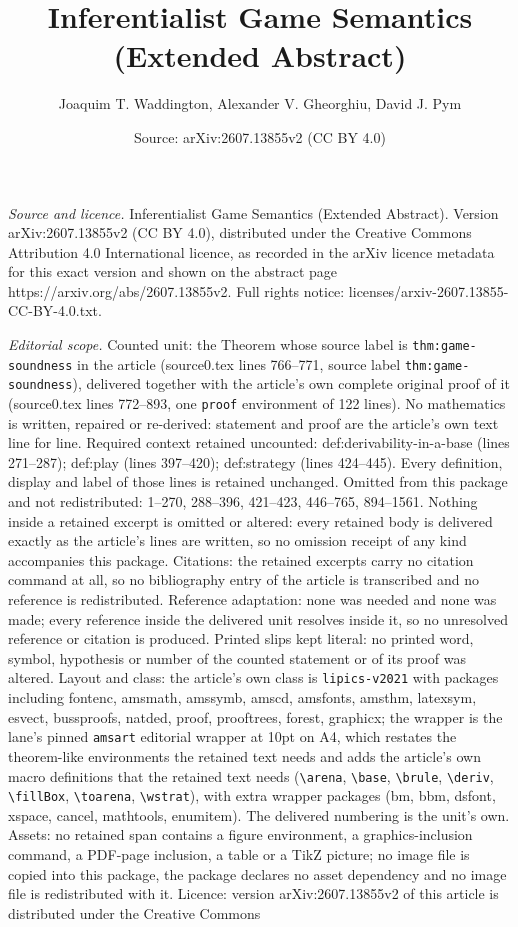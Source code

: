 \documentclass[10pt,a4paper]{amsart}
\title[Inferentialist Game Semantics (Extended Abstract)]{Inferentialist Game Semantics (Extended Abstract)}
\author{Joaquim T. Waddington, Alexander V. Gheorghiu, David J. Pym}
\date{Source: arXiv:2607.13855v2 (CC BY 4.0)}
\begin{document}
\maketitle

\noindent\emph{Source and licence.} Inferentialist Game Semantics (Extended Abstract). Version arXiv:2607.13855v2 (CC BY 4.0), distributed under the Creative Commons Attribution 4.0 International licence, as recorded in the arXiv licence metadata for this exact version and shown on the abstract page https://arxiv.org/abs/2607.13855v2. Full rights notice: licenses/arxiv-2607.13855-CC-BY-4.0.txt.\par\smallskip

\noindent\textit{Editorial scope.} Counted unit: the Theorem whose source label is \texttt{thm:game-soundness} in the article (source0.tex lines 766--771, source label \texttt{thm:game-soundness}), delivered together with the article's own complete original proof of it (source0.tex lines 772--893, one \texttt{proof} environment of 122 lines). No mathematics is written, repaired or re-derived: statement and proof are the article's own text line for line. Required context retained uncounted: def:derivability-in-a-base (lines 271--287); def:play (lines 397--420); def:strategy (lines 424--445). Every definition, display and label of those lines is retained unchanged. Omitted from this package and not redistributed: 1--270, 288--396, 421--423, 446--765, 894--1561. Nothing inside a retained excerpt is omitted or altered: every retained body is delivered exactly as the article's lines are written, so no omission receipt of any kind accompanies this package. Citations: the retained excerpts carry no citation command at all, so no bibliography entry of the article is transcribed and no reference is redistributed. Reference adaptation: none was needed and none was made; every reference inside the delivered unit resolves inside it, so no unresolved reference or citation is produced. Printed slips kept literal: no printed word, symbol, hypothesis or number of the counted statement or of its proof was altered. Layout and class: the article's own class is \texttt{lipics-v2021} with packages including fontenc, amsmath, amssymb, amscd, amsfonts, amsthm, latexsym, esvect, bussproofs, natded, proof, prooftrees, forest, graphicx; the wrapper is the lane's pinned \texttt{amsart} editorial wrapper at 10pt on A4, which restates the theorem-like environments the retained text needs and adds the article's own macro definitions that the retained text needs (\texttt{\textbackslash arena}, \texttt{\textbackslash base}, \texttt{\textbackslash brule}, \texttt{\textbackslash deriv}, \texttt{\textbackslash fillBox}, \texttt{\textbackslash toarena}, \texttt{\textbackslash wstrat}), with extra wrapper packages (bm, bbm, dsfont, xspace, cancel, mathtools, enumitem). The delivered numbering is the unit's own. Assets: no retained span contains a figure environment, a graphics-inclusion command, a PDF-page inclusion, a table or a TikZ picture; no image file is copied into this package, the package declares no asset dependency and no image file is redistributed with it. Licence: version arXiv:2607.13855v2 of this article is distributed under the Creative Commons 
\end{document}
